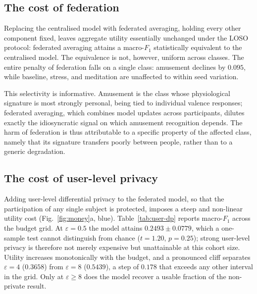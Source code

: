 \subsection{The cost of federation}
\label{sec:results-federation}

Replacing the centralised model with federated averaging, holding every other
component fixed, leaves aggregate utility essentially unchanged under the LOSO
protocol: federated averaging attains a macro-$F_1$ statistically equivalent to
the centralised model. The equivalence is not, however, uniform across classes.
The entire penalty of federation falls on a single class: amusement declines by
$0.095$, while baseline, stress, and meditation are unaffected to within seed
variation.

This selectivity is informative. Amusement is the class whose physiological
signature is most strongly personal, being tied to individual valence responses;
federated averaging, which combines model updates across participants, dilutes
exactly the idiosyncratic signal on which amusement recognition depends. The
harm of federation is thus attributable to a specific property of the affected
class, namely that its signature transfers poorly between people, rather than to
a generic degradation.

\subsection{The cost of user-level privacy}
\label{sec:results-user-dp}

Adding user-level differential privacy to the federated model, so that the
participation of any single subject is protected, imposes a steep and
non-linear utility cost (Fig.~\ref{fig:money}a, blue). Table~\ref{tab:user-dp}
reports macro-$F_1$ across the budget grid. At $\varepsilon = 0.5$ the model
attains $0.2493 \pm 0.0779$, which a one-sample test cannot distinguish from
chance ($t = 1.20$, $p = 0.25$); strong user-level privacy is therefore not
merely expensive but unattainable at this cohort size. Utility increases
monotonically with the budget, and a pronounced cliff separates $\varepsilon = 4$
($0.3658$) from $\varepsilon = 8$ ($0.5439$), a step of $0.178$ that exceeds any
other interval in the grid. Only at $\varepsilon \geq 8$ does the model recover a
usable fraction of the non-private result.


